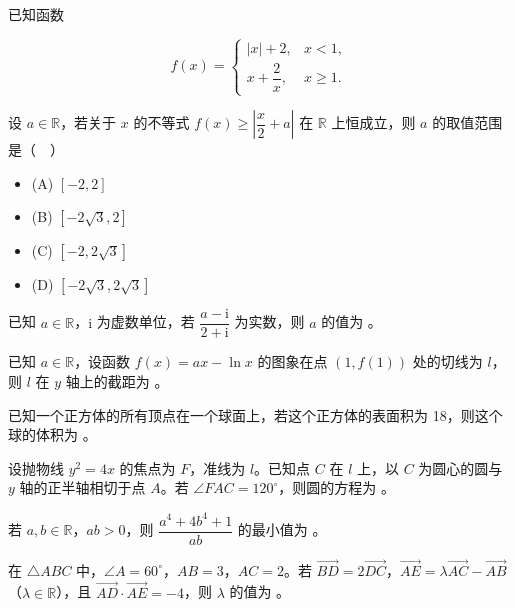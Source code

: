\begin{question}
已知函数

\nopagebreak[4]
\[
f(x)=\begin{cases}|x|+2,&x<1,\\x+\dfrac2x,&x\geqslant1.\end{cases}
\]

设 $a\in\mathbb R$，若关于 $x$ 的不等式 $f(x)\geqslant\left|\dfrac x2+a\right|$ 在 $\mathbb R$ 上恒成立，则 $a$ 的取值范围是（　）

\begin{itemize}
\item (A) $[-2,2]$
\item (B) $[-2\sqrt3,2]$
\item (C) $[-2,2\sqrt3]$
\item (D) $[-2\sqrt3,2\sqrt3]$
\end{itemize}

\end{question}

\begin{question}
已知 $a\in\mathbb R$，$\mathrm i$ 为虚数单位，若 $\dfrac{a-\mathrm i}{2+\mathrm i}$ 为实数，则 $a$ 的值为 \gkblank{}。

\end{question}
\begin{question}
已知 $a\in\mathbb R$，设函数 $f(x)=ax-\ln x$ 的图象在点 $(1,f(1))$ 处的切线为 $l$，则 $l$ 在 $y$ 轴上的截距为 \gkblank{}。

\end{question}
\begin{question}
已知一个正方体的所有顶点在一个球面上，若这个正方体的表面积为 18，则这个球的体积为 \gkblank{}。

\end{question}
\begin{question}
设抛物线 $y^2=4x$ 的焦点为 $F$，准线为 $l$。已知点 $C$ 在 $l$ 上，以 $C$ 为圆心的圆与 $y$ 轴的正半轴相切于点 $A$。若 $\angle FAC=120^\circ$，则圆的方程为 \gkblank{}。

\end{question}
\begin{question}
若 $a,b\in\mathbb R$，$ab>0$，则 $\dfrac{a^4+4b^4+1}{ab}$ 的最小值为 \gkblank{}。

\end{question}
\begin{question}
在 $\triangle ABC$ 中，$\angle A=60^\circ$，$AB=3$，$AC=2$。若 $\overrightarrow{BD}=2\overrightarrow{DC}$，$\overrightarrow{AE}=\lambda\overrightarrow{AC}-\overrightarrow{AB}$（$\lambda\in\mathbb R$），且 $\overrightarrow{AD}\cdot\overrightarrow{AE}=-4$，则 $\lambda$ 的值为 \gkblank{}。

\end{question}

